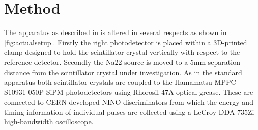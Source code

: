 \section{Method}
The apparatus as described in \cite{arron_Meyer_Pauwels_Lecoq_2012} is altered in several respects as shown in \ref{fig:actualsetup}. Firstly the right photodetector is placed within a 3D-printed clamp designed to hold the scintillator crystal vertically with respect to the reference detector. Secondly the Na22 source is moved to a 5mm separation distance from the scintillator crystal under investigation. As in the standard apparatus both scintillator crystals are coupled to the Hamamatsu MPPC S10931-050P SiPM photodetectors using Rhorosil 47A optical grease. These are connected to CERN-developed NINO discriminators from which the energy and timing information of individual pulses are collected using a LeCroy DDA 735Zi high-bandwidth oscilloscope.
